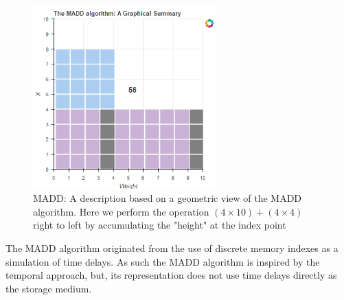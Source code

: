 \documentclass{article}
\begin{document}
\begin{figure}[ht]
	\centerline{\includegraphics[width=200pt]{figures/rId37.png}}
	\caption{MADD: A description based on a geometric view of the MADD algorithm. Here we perform the operation $(4 \times 10)+(4 \times 4)$ right to left by accumulating the "height" at the index point}\label{fig:madd}
\end{figure}

The MADD algorithm originated from the use of discrete memory indexes as a simulation of time delays. As such the MADD algorithm is inspired by the temporal approach, but, its representation does not use time delays directly as the storage medium.
\end{document}

